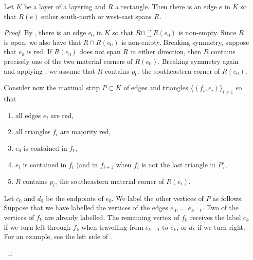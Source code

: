 \documentclass[12pt]{amsart}
\begin{document}
\begin{lemma}
\label{Lem:SpannedSNOrWE}
Let $K$ be a layer of a layering and $R$ a rectangle. Then there is an edge $e$ in $K$ so that $R(e)$ either south-north or west-east spans $R$.
\end{lemma}

\begin{proof}
By , there is an edge $e_0$ in $K$ so that $R\cap \closure{R}(e_0)$ is non-empty.  Since $R$ is open, we also have that $R \cap R(e_0)$ is non-empty.  Breaking symmetry, suppose that $e_0$ is red.  If $R(e_0)$ does not span $R$ in either direction, then $R$ contains precisely one of the two material corners of $R(e_0)$.  Breaking symmetry again and applying , we assume that $R$ contains $p_0$, the southeastern corner of $R(e_0)$.  

Consider now the maximal strip $P \subset K$ of edges and triangles $\{(f_i, e_i)\}_{i \geq 1}$ so that 
\begin{enumerate}
\item
all edges $e_i$ are red, 
\item
all triangles $f_i$ are majority red,
\item 
$e_0$ is contained in $f_1$, 
\item
$e_i$ is contained in $f_i$ (and in $f_{i+1}$ when $f_i$ is not the last triangle in $P$), 
\item
$R$ contains $p_i$, the southeastern material corner of $R(e_i)$. 
\end{enumerate}

Let $c_0$ and $d_0$ be the endpoints of $e_0$.  We label the other vertices of $P$ as follows.  Suppose that we have labelled the vertices of the edges $e_0, \ldots, e_{k-1}$.  Two of the vertices of $f_k$ are already labelled.  The remaining vertex of $f_k$ receives the label  $c_k$ if we turn left through $f_k$ when travelling from $e_{k-1}$ to $e_k$, or $d_k$ if we turn right.  For an example, see the left side of .

\begin{figure}[htbp]


\end{figure}
\end{proof}
\end{document}
